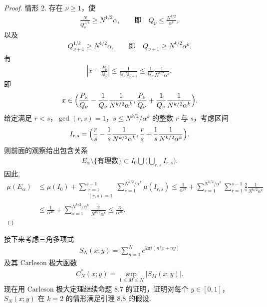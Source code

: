 \begin{proof}
情形 2. 存在 $\nu \geq 1$，使
\begin{align*}
  \frac{N}{Q_{\nu}^{1/k}}\geq N^{1/2}\alpha,\qquad \text{即}\quad Q_{\nu}\leq\frac{N^{k/2}}{\alpha^{k}},
\end{align*}
以及
\begin{align*}
  Q_{\nu+1}^{1/k}\geq N^{1/2}\alpha,\qquad \text{即}\quad Q_{\nu+1}\geq N^{k/2}\alpha^{k}.
\end{align*}
有
\begin{align*}
  \left|x-\frac{P_{\nu}}{Q_{\nu}}\right|\leq\frac{1}{Q_{\nu}Q_{\nu+1}}
  \leq\frac{1}{Q_{\nu}}\frac{1}{N^{k/2}\alpha^{k}},
\end{align*}
即
\begin{align*}
  x\in\Bigl(\frac{P_{\nu}}{Q_{\nu}}-\frac{1}{Q_{\nu}}\frac{1}{N^{k/2}\alpha^{k}},
  \frac{P_{\nu}}{Q_{\nu}}+\frac{1}{Q_{\nu}}\frac{1}{N^{k/2}\alpha^{k}}\Bigr).
\end{align*}
给定满足 $r < s$，$\gcd(r, s) = 1$，$s \leq N^{k/2}/\alpha^k$ 的整数 $r$ 与 $s$，考虑区间
\begin{align*}
  I_{r,s}=\Bigl(\frac{r}{s}-\frac{1}{s}\frac{1}{N^{k/2}\alpha^{k}},
  \frac{r}{s}+\frac{1}{s}\frac{1}{N^{k/2}\alpha^{k}}\Bigr).
\end{align*}
则前面的观察给出包含关系
\begin{align*}
  E_{\alpha}\setminus\{\text{有理数}\}\subset I_{0}\bigcup\Big(\bigcup_{r,s}I_{r,s}\Big).
\end{align*}
因此,
\begin{align*}
  \mu(E_{\alpha})
  &\leq\mu(I_{0})+\sum_{\substack{r=1\\ (r,s)=1}}^{s-1}\sum_{s=1}^{N^{k/2}/\alpha^{k}}\mu(I_{r,s})
  \leq\frac{1}{\alpha^{2k}}+\sum_{s=1}^{N^{k/2}/\alpha^{k}}\sum_{r=1}^{s-1}
   \frac{2}{s}\frac{1}{N^{k/2}\alpha^{k}}\\
  &\leq\frac{1}{\alpha^{2k}}+\sum_{s=1}^{N^{k/2}/\alpha^{k}}\frac{2}{N^{k/2}\alpha^{k}}
  \leq\frac{3}{\alpha^{2k}}.
\end{align*}
\end{proof}

接下来考虑三角多项式
\begin{align*}
  S_{N}(x;y)=\sum_{n=1}^{N}e^{2\pi i(n^{2}x+ny)}
\end{align*}
及其 Carleson 极大函数
\begin{align*}
  C_{N}^{*}(x;y)=\sup_{1\leq M\leq N}|S_{M}(x;y)|.
\end{align*}
现在用 Carleson 极大定理继续命题 8.7 的证明，证明对每个 $y \in [0,1]$，$S_N(x; y)$ 在 $k = 2$ 的情形满足引理 8.8 的假设.

